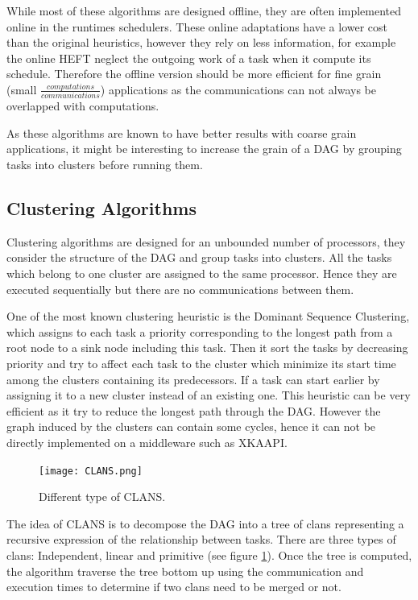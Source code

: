 \documentclass[10pt, conference, compsocconf,pdftex,dvipsnames]{IEEEtran}
\begin{document}
While most of these algorithms are designed offline, they are often
implemented online in the runtimes schedulers. These online adaptations have a
lower cost than the original heuristics, however they rely on less
information, for example the online HEFT neglect the outgoing work of a task
when it compute its schedule. Therefore the offline version should be more
efficient for fine grain (small $\frac{computations}{communications}$)
applications as the communications can not always be overlapped with
computations.

As these algorithms are known to have better results with coarse grain
applications, it might be interesting to increase the grain of a DAG by
grouping tasks into clusters before running them.

\subsection{Clustering Algorithms}

Clustering algorithms are designed for an unbounded number of processors, they
consider the structure of the DAG and group tasks into clusters. All the tasks
which belong to one cluster are assigned to the same processor. Hence they are
executed sequentially but there are no communications between them.  

One of the most known clustering heuristic is the Dominant Sequence
Clustering\cite{yang1994dsc}, which assigns to each task a priority
corresponding to the longest path from a root node to a sink node including
this task. Then it sort the tasks by decreasing priority and try to affect
each task to the cluster which minimize its start time among the clusters
containing its predecessors. If a task can start earlier by assigning it to a
new cluster instead of an existing one.  This heuristic can be very efficient
as it try to reduce the longest path through the DAG. However the graph
induced by the clusters can contain some cycles, hence it can not be directly
implemented on a middleware such as XKAAPI.

\begin{figure}[htb]
    \centering
    \texttt{[image: CLANS.png]}
    \caption{Different type of CLANS.}
    \label{fig:clans}
\end{figure}

The idea of CLANS
\cite{aubum1990efficient,mccreary1993partitioning,mccreary1993graph} is to
decompose the DAG into a tree of clans representing a recursive expression of
the relationship between tasks. 
There are three types of clans:
Independent, linear and primitive (see figure \ref{fig:clans}). Once the tree
is computed, the algorithm traverse the tree bottom up using the communication
and execution times to determine if two clans need to be merged or not.
\end{document}
